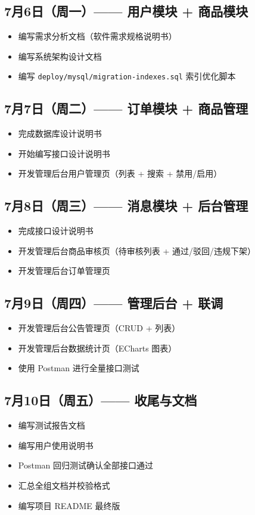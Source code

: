 \documentclass[12pt,a4paper]{ctexart}
\begin{document}
\subsection{7月6日（周一）—— 用户模块 + 商品模块}
\begin{itemize}
    \item 编写需求分析文档（软件需求规格说明书）
    \item 编写系统架构设计文档
    \item 编写 \texttt{deploy/mysql/migration-indexes.sql} 索引优化脚本
\end{itemize}

\subsection{7月7日（周二）—— 订单模块 + 商品管理}
\begin{itemize}
    \item 完成数据库设计说明书
    \item 开始编写接口设计说明书
    \item 开发管理后台用户管理页（列表 + 搜索 + 禁用/启用）
\end{itemize}

\subsection{7月8日（周三）—— 消息模块 + 后台管理}
\begin{itemize}
    \item 完成接口设计说明书
    \item 开发管理后台商品审核页（待审核列表 + 通过/驳回/违规下架）
    \item 开发管理后台订单管理页
\end{itemize}

\subsection{7月9日（周四）—— 管理后台 + 联调}
\begin{itemize}
    \item 开发管理后台公告管理页（CRUD + 列表）
    \item 开发管理后台数据统计页（ECharts 图表）
    \item 使用 Postman 进行全量接口测试
\end{itemize}

\subsection{7月10日（周五）—— 收尾与文档}
\begin{itemize}
    \item 编写测试报告文档
    \item 编写用户使用说明书
    \item Postman 回归测试确认全部接口通过
    \item 汇总全组文档并校验格式
    \item 编写项目 README 最终版
\end{itemize}
\end{document}
